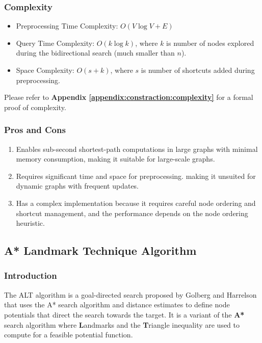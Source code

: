 	\subsubsection{Complexity}
	\begin{itemize}
		\item Preprocessing Time Complexity: \(O(V \log V + E)\)
		\item Query Time Complexity: \(O(k \log k)\), where \(k\) is number of nodes explored during the bidirectional search (much smaller than \(n\)).
		\item Space Complexity: \(O(s+k)\), where \(s\) is number of shortcuts added during preprocessing.
	\end{itemize}
	Please refer to \textbf{Appendix \ref{appendix:constraction:complexity}} for a formal proof of complexity.
	\subsubsection{Pros and Cons}
	\begin{enumerate}
		\item Enables sub-second shortest-path computations in large graphs with minimal memory consumption, making it suitable for large-scale graphs.  
		\item Requires significant time and space for preprocessing. making it unsuited for dynamic graphs with frequent updates. 
		\item Has a complex implementation because it requires careful node ordering and shortcut management, and the performance depends on the node ordering heuristic.
		
	\end{enumerate}
	\subsection{A* Landmark Technique Algorithm}
		\subsubsection{Introduction}
			The ALT algorithm is a goal-directed search proposed by Golberg and Harrelson that uses the A* search algorithm and distance estimates to define node potentials that direct the search towards the target.
			It is a variant of the \textbf{A*} search algorithm where \textbf{L}andmarks and the \textbf{T}riangle inequality are used to compute for a feasible potential function. 
